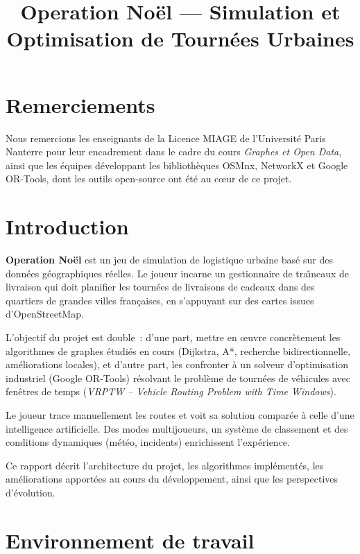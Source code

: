 \documentclass[a4paper, 12pt, twoside]{article}
\title{Operation No\"{e}l --- Simulation et Optimisation de Tourn\'{e}es Urbaines}
\begin{document}
\pagedegarde

\section*{Remerciements}
Nous remercions les enseignants de la Licence MIAGE de l'Universit\'{e} Paris Nanterre pour leur encadrement dans le cadre du cours \textit{Graphes et Open Data}, ainsi que les \'{e}quipes d\'{e}veloppant les biblioth\`{e}ques OSMnx, NetworkX et Google OR-Tools, dont les outils open-source ont \'{e}t\'{e} au c\oe ur de ce projet.

\newpage
\tableofcontents
\newpage

\section{Introduction}

\textbf{Operation No\"{e}l} est un jeu de simulation de logistique urbaine bas\'{e} sur des donn\'{e}es g\'{e}ographiques r\'{e}elles. Le joueur incarne un gestionnaire de tra\^{\i}neaux de livraison qui doit planifier les tourn\'{e}es de livraisons de cadeaux dans des quartiers de grandes villes fran\c{c}aises, en s'appuyant sur des cartes issues d'OpenStreetMap.

L'objectif du projet est double~: d'une part, mettre en \oe uvre concr\`{e}tement les algorithmes de graphes \'{e}tudi\'{e}s en cours (Dijkstra, A*, recherche bidirectionnelle, am\'{e}liorations locales), et d'autre part, les confronter \`{a} un solveur d'optimisation industriel (Google OR-Tools) r\'{e}solvant le probl\`{e}me de tourn\'{e}es de v\'{e}hicules avec fen\^{e}tres de temps (\textit{VRPTW -- Vehicle Routing Problem with Time Windows}).

Le joueur trace manuellement les routes et voit sa solution compar\'{e}e \`{a} celle d'une intelligence artificielle. Des modes multijoueurs, un syst\`{e}me de classement et des conditions dynamiques (m\'{e}t\'{e}o, incidents) enrichissent l'exp\'{e}rience.

Ce rapport d\'{e}crit l'architecture du projet, les algorithmes impl\'{e}ment\'{e}s, les am\'{e}liorations apport\'{e}es au cours du d\'{e}veloppement, ainsi que les perspectives d'\'{e}volution.

\section{Environnement de travail}
\end{document}
